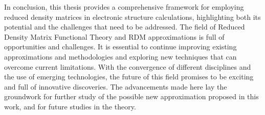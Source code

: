 In conclusion, this thesis provides a comprehensive framework for employing 
reduced density matrices in electronic structure calculations, highlighting both
its potential and the challenges that need to be addressed.
The field of Reduced Density Matrix Functional Theory and RDM approximations is
full of opportunities and challenges.
It is essential to continue improving existing 
approximations and methodologies and exploring new techniques that can overcome current limitations.
With the convergence of different disciplines and the use of emerging 
technologies, the future of this field promises to be exciting and full of 
innovative discoveries.
The advancements made here lay the groundwork for further study of the possible
new approximation proposed in this work, and for future studies in the theory.

